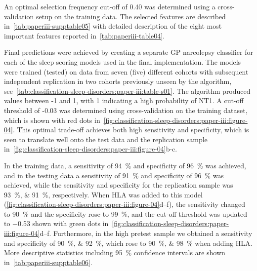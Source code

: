 An optimal selection frequency cut-off of 0.40 was determined using a cross-validation setup on the training data. 
The selected features are described in~\cref{tab:paperiii-supptable05} with detailed description of the eight most important features reported in~\cref{tab:paperiii-table04}.

Final predictions were achieved by creating a separate \ac{GP} narcolepsy classifier for each of the sleep scoring models used in the final implementation. 
The models were trained (tested) on data from seven (five) different cohorts with subsequent independent replication in two cohorts previously unseen by the algorithm, see~\cref{tab:classification-sleep-disorders:paper-iii:table-s01}.
The algorithm produced values between -1 and 1, with 1 indicating a high probability of \ac{NT1}.
A cut-off threshold of -0.03 was determined using cross-validation on the training dataset, which is shown with red dots in~\cref{fig:classification-sleep-disorders:paper-iii:figure-04}. 
This optimal trade-off achieves both high sensitivity and specificity, which is seen to translate well onto the test data and the replication sample in~\cref{fig:classification-sleep-disorders:paper-iii:figure-04}b-c.

In the training data, a sensitivity of \SI{94}{\percent} and specificity of
\SI{96}{\percent} was achieved, and in the testing data a sensitivity of \SI{91}{\percent} and specificity of \SI{96}{\percent} was achieved, while the sensitivity and specificity for the replication sample was \SIlist{93;91}{\percent}, respectively. 
When \ac{HLA} was added to this model (\cref{fig:classification-sleep-disorders:paper-iii:figure-04}d--f), the sensitivity changed to \SI{90}{\percent} and the specificity rose to \SI{99}{\percent}, and the cut-off threshold was updated to \num{-0.53} shown with green dots in~\cref{fig:classification-sleep-disorders:paper-iii:figure-04}d--f.
Furthermore, in the high pretest sample we obtained a sensitivity and specificity of \SIlist{90;92}{\percent}, which rose to \SIlist{90;98}{\percent} when adding \ac{HLA}.
More descriptive statistics including \SI{95}{\percent} confidence intervals are shown in~\cref{tab:paperiii-supptable06}.

